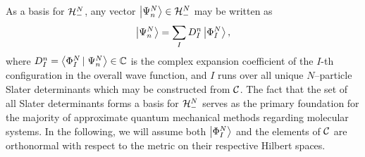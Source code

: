 As a basis for $\mathcal{H}^N_-$, any vector $\left\vert \Psi_n^N \right\rangle \in \mathcal{H}^N_-$ may be written as \cite{Ostlund12_book}
\begin{equation}
\label{eq:SDBasis}
\left\vert \Psi_n^N \right\rangle = \sum_I D^n_I \left\vert \Phi^N_I \right\rangle,
\end{equation}
where $D^n_I = \left\langle \Phi^N_I \left\vert\right. \Psi^N_n \right\rangle\in\mathbb C$ is the complex expansion coefficient of the $I$-th configuration in the overall wave function,
and $I$ runs over all unique $N$--particle Slater determinants which may be constructed from $\mathcal{C}$.
The fact that the set of all Slater determinants forms a basis for $\mathcal{H}^N_-$
serves as the primary foundation for the majority of approximate quantum mechanical methods regarding molecular
systems. In the following, we will assume both $\left\vert \Phi^N_I \right\rangle$ and the elements of $\mathcal{C}$ are orthonormal
with respect to the metric on their respective Hilbert spaces.

